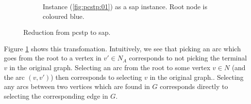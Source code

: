 \begin{figure}[h]
\begin{subfigure}[t]{0.47\linewidth}
    \caption{Instance (\ref{fig:pcstp:01}) as a \gls{sap} instance. Root node is coloured blue.}
  \end{subfigure}
  \caption{Reduction from \gls{pcstp} to \gls{sap}.}
  \label{fig:scip:pcstptosap}
\end{figure}

Figure \ref{fig:scip:pcstptosap} shows this transfomation. Intuitively, we see that
picking an arc which goes from the root to a vertex in $v' \in N_A$
corresponds to not picking the terminal $v$ in the original graph. Selecting an arc from the root
to some vertex $v \in N$ (and the arc $(v, v')$) then corresponds to selecting $v$
in the original graph.. Selecting any arcs between two vertices which are found in $G$ corresponds
directly to selecting the corresponding edge in $G$.

